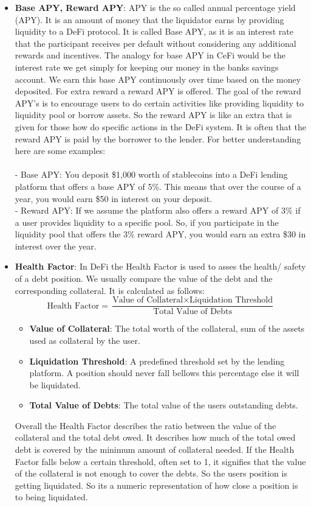 \documentclass{article}
\begin{document}
\begin{itemize}
\item \textbf{Base APY, Reward APY}: APY is the so called annual percentage yield (APY). It is an amount of money that the liquidator earns by providing liquidity to a DeFi protocol. It is called Base APY, as it is an interest rate that the participant receives per default without considering any additional rewards and incentives. The analogy for base APY in CeFi would be the interest rate we get simply for keeping our money in the banks savings account. We earn this base APY continuously over time based on the money deposited. For extra reward a reward APY is offered. The goal of the reward APY's is to encourage users to do certain activities like providing liquidity to liquidity pool or borrow assets. So the reward APY is like an extra that is given for those how do specific actions in the DeFi system. It is often that the reward APY is paid by the borrower to the lender. For better understanding here are some examples:\\\\
- Base APY: You deposit \$1,000 worth of stablecoins into a DeFi lending platform that offers a base APY of 5\%. This means that over the course of a year, you would earn \$50 in interest on your deposit.\\
- Reward APY: If we assume the platform also offers a reward APY of 3\% if a user provides liquidity to a specific pool. So, if you participate in the liquidity pool that offers the 3\% reward APY, you would earn an extra \$30 in interest over the year. 

 \item \textbf{Health Factor}: In DeFi the Health Factor is used to asses the health/ safety of a debt position. We usually compare the value of the debt and the corresponding collateral. It is calculated as follows:
\[ \text{Health Factor} = \frac{\text{Value of Collateral} \times \text{Liquidation Threshold}}{\text{Total Value of Debts}} \]
\begin{itemize}
    \item \textbf{Value of Collateral}: The total worth of the collateral, sum of the assets used as collateral by the user.
    \item \textbf{Liquidation Threshold}: A predefined threshold set by the lending platform. A position should never fall bellows this percentage else it will be liquidated.
    \item \textbf{Total Value of Debts}: The total value of the users outstanding debts.
\end{itemize}
Overall the Health Factor describes the ratio between the value of the collateral and the total debt owed. It describes how much of the total owed debt is covered by the minimum amount of collateral needed. If the Health Factor falls below a certain threshold, often set to 1, it signifies that the value of the collateral is not enough to cover the debts. So the users position is getting liquidated. So its a numeric representation of how close a position is to being liquidated. %


\end{itemize}
\end{document}
